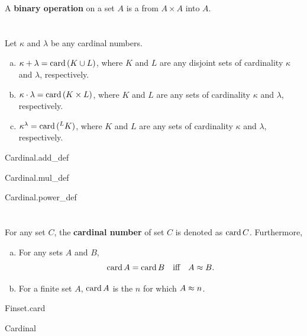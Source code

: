 \documentclass{report}
\begin{document}
  A \textbf{binary operation} on a set $A$ is a  from
    $A \times A$ into $A$.

\section{}%

  Let $\kappa$ and $\lambda$ be any cardinal numbers.
  \begin{enumerate}[(a)]
    \item $\kappa + \lambda = \mathop{\text{card}}{(K \cup L)}$, where $K$ and $L$ are any
      disjoint sets of cardinality $\kappa$ and $\lambda$, respectively.
    \item $\kappa \cdot \lambda = \mathop{\text{card}}{(K \times L)}$, where $K$ and $L$ are
      any sets of cardinality $\kappa$ and $\lambda$, respectively.
    \item $\kappa^\lambda = \mathop{\text{card}}{(^L{K})}$, where $K$ and $L$ are any sets of
      cardinality $\kappa$ and $\lambda$, respectively.
  \end{enumerate}

    {Cardinal.add\_def}

    {Cardinal.mul\_def}

    {Cardinal.power\_def}

\section{}%

  For any set $C$, the \textbf{cardinal number} of set $C$ is denoted as
    $\mathop{\text{card}}{C}$.
  Furthermore,
    \begin{enumerate}[(a)]
      \item For any sets $A$ and $B$,
        $$\mathop{\text{card}}{A} = \mathop{\text{card}}{B} \quad\text{iff}\quad A \approx B.$$
      \item For a finite set $A$, $\mathop{\text{card}}{A}$ is the 
        $n$ for which $A \approx n$.
    \end{enumerate}

    {Finset.card}

    {Cardinal}

\section{}%
\end{document}
